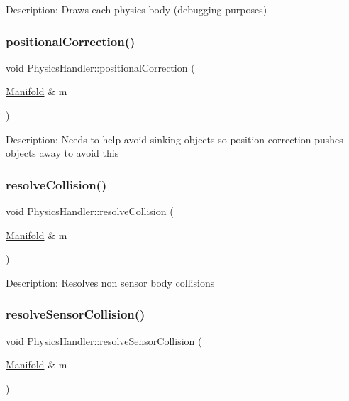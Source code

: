 Description\+: Draws each physics body (debugging purposes) \mbox{\label{class_physics_handler_a936a971e834ed56067bfa1910fb1ae87}} 
\subsubsection{\texorpdfstring{positionalCorrection()}{positionalCorrection()}}
{\footnotesize\ttfamily void Physics\+Handler\+::positional\+Correction (\begin{DoxyParamCaption}\item[{\mbox{\hyperlink{struct_physics_handler_1_1_manifold}{Manifold}} \&}]{m }\end{DoxyParamCaption})\hspace{0.3cm}{\ttfamily [static]}}

Description\+: Needs to help avoid sinking objects so position correction pushes objects away to avoid this \mbox{\label{class_physics_handler_a43422655392a4b669bd57445d049531b}} 
\subsubsection{\texorpdfstring{resolveCollision()}{resolveCollision()}}
{\footnotesize\ttfamily void Physics\+Handler\+::resolve\+Collision (\begin{DoxyParamCaption}\item[{\mbox{\hyperlink{struct_physics_handler_1_1_manifold}{Manifold}} \&}]{m }\end{DoxyParamCaption})\hspace{0.3cm}{\ttfamily [static]}}

Description\+: Resolves non sensor body collisions \mbox{\label{class_physics_handler_a21e6ab8bd30b5659639e1ba8cecc9410}} 
\subsubsection{\texorpdfstring{resolveSensorCollision()}{resolveSensorCollision()}}
{\footnotesize\ttfamily void Physics\+Handler\+::resolve\+Sensor\+Collision (\begin{DoxyParamCaption}\item[{\mbox{\hyperlink{struct_physics_handler_1_1_manifold}{Manifold}} \&}]{m }\end{DoxyParamCaption})\hspace{0.3cm}{\ttfamily [static]}}

